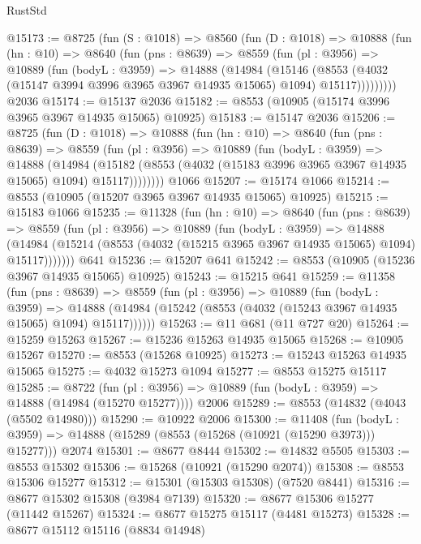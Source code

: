 \begin{lexlean}{RustStd}
\begin{coremodule}
@15173 := @8725
    (fun (S : @1018) =>
    @8560
      (fun (D : @1018) =>
      @10888
        (fun (hn : @10) =>
        @8640
          (fun (pns : @8639) =>
          @8559
            (fun (pl : @3956) =>
            @10889
              (fun (bodyL : @3959) =>
              @14888
                (@14984
                  (@15146
                    (@8553
                      (@4032 (@15147 @3994 @3996 @3965 @3967 @14935 @15065) @1094)
                      @15117)))))))))
    @2036
@15174 := @15137 @2036
@15182 := @8553 (@10905 (@15174 @3996 @3965 @3967 @14935 @15065) @10925)
@15183 := @15147 @2036
@15206 := @8725
    (fun (D : @1018) =>
    @10888
      (fun (hn : @10) =>
      @8640
        (fun (pns : @8639) =>
        @8559
          (fun (pl : @3956) =>
          @10889
            (fun (bodyL : @3959) =>
            @14888
              (@14984
                (@15182 (@8553 (@4032 (@15183 @3996 @3965 @3967 @14935 @15065) @1094) @15117))))))))
    @1066
@15207 := @15174 @1066
@15214 := @8553 (@10905 (@15207 @3965 @3967 @14935 @15065) @10925)
@15215 := @15183 @1066
@15235 := @11328
    (fun (hn : @10) =>
    @8640
      (fun (pns : @8639) =>
      @8559
        (fun (pl : @3956) =>
        @10889
          (fun (bodyL : @3959) =>
          @14888
            (@14984 (@15214 (@8553 (@4032 (@15215 @3965 @3967 @14935 @15065) @1094) @15117)))))))
    @641
@15236 := @15207 @641
@15242 := @8553 (@10905 (@15236 @3967 @14935 @15065) @10925)
@15243 := @15215 @641
@15259 := @11358
    (fun (pns : @8639) =>
    @8559
      (fun (pl : @3956) =>
      @10889
        (fun (bodyL : @3959) =>
        @14888 (@14984 (@15242 (@8553 (@4032 (@15243 @3967 @14935 @15065) @1094) @15117))))))
@15263 := @11 @681 (@11 @727 @20)
@15264 := @15259 @15263
@15267 := @15236 @15263 @14935 @15065
@15268 := @10905 @15267
@15270 := @8553 (@15268 @10925)
@15273 := @15243 @15263 @14935 @15065
@15275 := @4032 @15273 @1094
@15277 := @8553 @15275 @15117
@15285 := @8722
    (fun (pl : @3956) => @10889 (fun (bodyL : @3959) => @14888 (@14984 (@15270 @15277))))
    @2006
@15289 := @8553 (@14832 (@4043 (@5502 @14980)))
@15290 := @10922 @2006
@15300 := @11408
    (fun (bodyL : @3959) => @14888 (@15289 (@8553 (@15268 (@10921 (@15290 @3973))) @15277)))
    @2074
@15301 := @8677 @8444
@15302 := @14832 @5505
@15303 := @8553 @15302
@15306 := @15268 (@10921 (@15290 @2074))
@15308 := @8553 @15306 @15277
@15312 := @15301 (@15303 @15308) (@7520 @8441)
@15316 := @8677 @15302 @15308 (@3984 @7139)
@15320 := @8677 @15306 @15277 (@11442 @15267)
@15324 := @8677 @15275 @15117 (@4481 @15273)
@15328 := @8677 @15112 @15116 (@8834 @14948)

\end{coremodule}
\end{lexlean}

